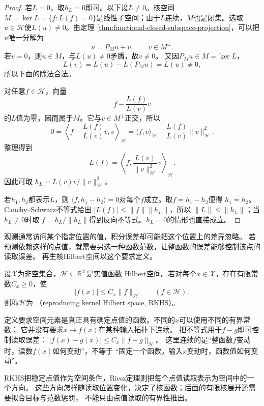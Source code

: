 \begin{proof}
若$L=0$，取$h_L=0$即可。以下设$L\neq0$。核空间
$M=\ker L=\{f:L(f)=0\}$是线性子空间；由于$L$连续，$M$也是闭集。选取
$u\in\mathcal{H}$使$L(u)\neq0$。由定理
\ref{thm:functional-closed-subspace-projection}，可以把$u$唯一分解为
\[
  u=P_Mu+v,\qquad v\in M^\perp.
\]
若$v=0$，则$u\in M$，与$L(u)\neq0$矛盾，故$v\neq0$。
又因$P_Mu\in M=\ker L$，
\[
  L(v)=L(u)-L(P_Mu)=L(u)\neq0,
\]
所以下面的除法合法。

对任意$f\in\mathcal{H}$，向量
\[
  f-\frac{L(f)}{L(v)}v
\]
的$L$值为零，因而属于$M$。它与$v\in M^\perp$正交，所以
\[
  0
  =
  \left\langle
    f-\frac{L(f)}{L(v)}v,v
  \right\rangle_{\mathcal{H}}
  =
  \langle f,v\rangle_{\mathcal{H}}
  -
  \frac{L(f)}{L(v)}\lVert v\rVert_{\mathcal{H}}^2.
\]
整理得到
\[
  L(f)
  =
  \left\langle
    f,\frac{L(v)}{\lVert v\rVert_{\mathcal{H}}^2}v
  \right\rangle_{\mathcal{H}}.
\]
因此可取
$h_L=L(v)v/\lVert v\rVert_{\mathcal{H}}^2$。

若$h_1,h_2$都表示$L$，则
$\langle f,h_1-h_2\rangle=0$对每个$f$成立。取$f=h_1-h_2$便得
$h_1=h_2$。Cauchy--Schwarz不等式给出
$|L(f)|\leq\lVert f\rVert\lVert h_L\rVert$，所以
$\lVert L\rVert\leq\lVert h_L\rVert$；当$h_L\neq0$时取
$f=h_L/\lVert h_L\rVert$得到反向不等式。$h_L=0$的情形也直接成立。
\end{proof}

观测通常访问某个指定位置的值，积分误差却可能把这个位置上的差异忽略。
若预测依赖这样的点值，就需要另选一种函数范数，让整函数的误差能够控制该点的读取误差。
再生核Hilbert空间以这个要求定义。
\begin{definition}[再生核Hilbert空间]
\label{def:functional-rkhs}
设$\mathcal X$为非空集合，$\mathcal H\subseteq\mathbb R^{\mathcal X}$是实值函数
Hilbert空间。若对每个$x\in\mathcal X$，存在有限常数$C_x\geq0$，使
\[
 |f(x)|\leq C_x\lVert f\rVert_{\mathcal H}\qquad(f\in\mathcal H),
\]
则称$\mathcal H$为
（reproducing kernel Hilbert space, RKHS）。
\end{definition}
定义要求空间元素是真正具有确定点值的函数。不同的$x$可以使用不同的有界常数；
它并没有要求$x\mapsto f(x)$在某种输入拓扑下连续。
把不等式用于$f-g$即可控制读取误差：
$|f(x)-g(x)|\leq C_x\lVert f-g\rVert_{\mathcal H}$。
这里连续的是“整函数$f$变动时，读数$f(x)$如何变动”，不等于
“固定一个函数，输入$x$变动时，函数值如何变动”。

RKHS把稳定点值作为空间条件，Riesz定理则把每个点值读取表示为空间中的一个方向。
这些方向怎样随读取位置变化，决定了核函数；后面的有限核展开还需要拟合目标与范数惩罚，
不能只由点值读取的有界性推出。

